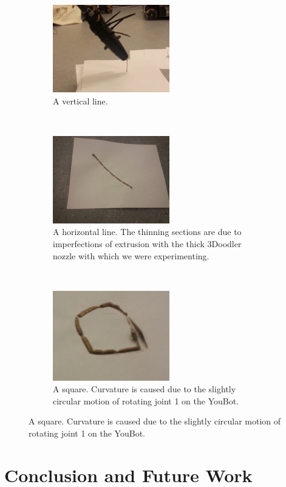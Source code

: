 \documentclass[conference]{acmsiggraph}
\begin{document}
\begin{figure}[t!]
\centering

\begin{subfigure}[t]{2.0in}
\centering
\includegraphics[width=2.0in, keepaspectratio]{images/vertical.jpg}
\caption{A vertical line.}
\label{fig:vertical}
\end{subfigure}
~
\begin{subfigure}[t]{2.0in}
\centering
\includegraphics[width=2.0in, keepaspectratio]{images/line.jpg}
\caption{A horizontal line.  The thinning sections are due to imperfections of extrusion with the thick 3Doodler nozzle with which we were experimenting.}
\label{fig:horizontal}
\end{subfigure}
~
\begin{subfigure}[t]{2.0in}
\centering
\includegraphics[width=2.0in, keepaspectratio]{images/toast.jpg}
\caption{A square.  Curvature is caused due to the slightly circular motion of rotating joint 1 on the YouBot.}
\label{fig:toast}
\end{subfigure}

\end{figure}

\section{Conclusion and Future Work}
\end{document}
